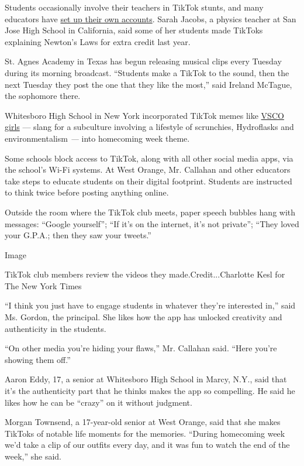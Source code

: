 Students occasionally involve their teachers in TikTok stunts, and many
educators have \href{http://vm.tiktok.com/5qKoQd/}{set up their own
accounts}. Sarah Jacobs, a physics teacher at San Jose High School in
California, said some of her students made TikToks explaining Newton's
Laws for extra credit last year.

St. Agnes Academy in Texas has begun releasing musical clips every
Tuesday during its morning broadcast. ``Students make a TikTok to the
sound, then the next Tuesday they post the one that they like the
most,'' said Ireland McTague, the sophomore there.

Whitesboro High School in New York incorporated TikTok memes like
\href{https://www.nytimes3xbfgragh.onion/2019/08/30/style/vsco-girls.html}{VSCO
girls} --- slang for a subculture involving a lifestyle of scrunchies,
Hydroflasks and environmentalism \emph{---} into homecoming week theme.

Some schools block access to TikTok, along with all other social media
apps, via the school's Wi-Fi systems. At West Orange, Mr. Callahan and
other educators take steps to educate students on their digital
footprint. Students are instructed to think twice before posting
anything online.

Outside the room where the TikTok club meets, paper speech bubbles hang
with messages: ``Google yourself''; ``If it's on the internet, it's not
private''; ``They loved your G.P.A.; then they saw your tweets.''

Image

TikTok club members review the videos they made.Credit...Charlotte Kesl
for The New York Times

``I think you just have to engage students in whatever they're
interested in,'' said Ms. Gordon, the principal. She likes how the app
has unlocked creativity and authenticity in the students.

``On other media you're hiding your flaws,'' Mr. Callahan said. ``Here
you're showing them off.''

Aaron Eddy, 17, a senior at Whitesboro High School in Marcy, N.Y., said
that it's the authenticity part that he thinks makes the app so
compelling. He said he likes how he can be ``crazy'' on it without
judgment.

Morgan Townsend, a 17-year-old senior at West Orange, said that she
makes TikToks of notable life moments for the memories. ``During
homecoming week we'd take a clip of our outfits every day, and it was
fun to watch the end of the week,'' she said.

